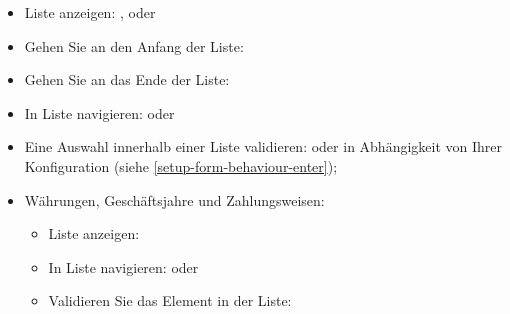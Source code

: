 \begin{itemize}
	\item Liste anzeigen: ,  oder \keys{\arrowkeydown}
	\item Gehen Sie an den Anfang der Liste: 
	\item Gehen Sie an das Ende der Liste: 
	\item In Liste navigieren: \keys{\arrowkeyup} oder \keys{\arrowkeydown}
	\item Eine Auswahl innerhalb einer Liste validieren: \keys{\return} oder \keys{\tab} in Abhängigkeit von Ihrer Konfiguration (siehe \vref{setup-form-behaviour-enter});
	\item Währungen, Geschäftsjahre und Zahlungsweisen:
	\begin{itemize}
		\item Liste anzeigen: 
		\item In Liste navigieren: \keys{\arrowkeyup} oder \keys{\arrowkeydown}
		\item Validieren Sie das Element in der Liste: 
	\end{itemize}
\end{itemize}

